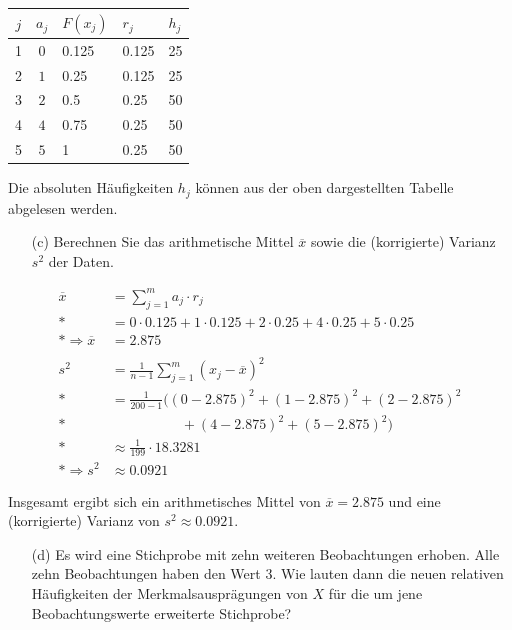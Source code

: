 \begin{table}[H]
\centering
\begin{tabular}{c|clll}
    $j$ & $a_j$ & $F(x_j)$ & $r_j$ & $h_j$ \\ \hline
    1   & $0$   & 0.125    & 0.125 & 25    \\
    2   & $1$   & 0.25     & 0.125 & 25    \\
    3   & $2$   & 0.5      & 0.25  & 50    \\
    4   & $4$   & 0.75     & 0.25  & 50    \\
    5   & $5$   & 1        & 0.25  & 50    \\
\end{tabular}
\end{table}
\nopagebreak
Die absoluten Häufigkeiten $h_j$ können aus der oben dargestellten Tabelle abgelesen werden.

\pagebreak

\begin{task}
    \begin{enumerate}
        \item[(c)] Berechnen Sie das arithmetische Mittel $\overline{x}$ sowie die (korrigierte) Varianz $s^2$ der Daten.
    \end{enumerate}
\end{task}

{\allowdisplaybreaks
    \begin{align*}
        \overline{x} &= \sum_{j=1}^m a_j\cdot r_j \\*
        &= 0\cdot 0.125 + 1\cdot 0.125 + 2\cdot 0.25 + 4\cdot 0.25 + 5\cdot 0.25 \\*
        \Rightarrow \overline{x} &= 2.875 \\
        \nonumber \\
        s^2 &= \frac{1}{n-1} \sum_{j=1}^m (x_j - \overline{x})^2 \\*
        &= \frac{1}{200-1} \big((0 - 2.875)^2 + (1 - 2.875)^2 + (2 - 2.875)^2 \\*
            &\qquad\qquad\quad + (4 - 2.875)^2 + (5 - 2.875)^2 \big) \\*
        &\approx \frac{1}{199} \cdot 18.3281 \\*
        \Rightarrow s^2 &\approx 0.0921
    \end{align*}
}

Insgesamt ergibt sich ein arithmetisches Mittel von $\overline{x} = 2.875$ und eine (korrigierte) Varianz von $s^2 \approx 0.0921$.


\begin{task}
    \begin{enumerate}
        \item[(d)] Es wird eine Stichprobe mit zehn weiteren Beobachtungen erhoben. Alle zehn Beobachtungen haben den Wert $3$. Wie lauten dann die neuen relativen Häufigkeiten der Merkmalsausprägungen von $X$ für die um jene Beobachtungswerte erweiterte Stichprobe?
    \end{enumerate}
\end{task}

